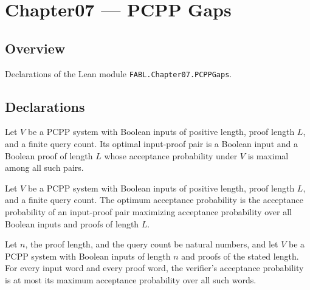 \chapter{Chapter07 — PCPP Gaps}
\section{Overview}

Declarations of the Lean module \texttt{FABL.Chapter07.PCPPGaps}.

\section{Declarations}

\begin{definition}
\label{FABL.PCPPSystem.optimalInputProof}
\leanok
{}
Let $V$ be a PCPP system with Boolean inputs of positive length, proof length $L$, and a
finite query count. Its optimal input-proof pair is a Boolean input and a Boolean proof
of length $L$ whose acceptance probability under $V$ is maximal among all such pairs.
\end{definition}

\begin{definition}
\label{FABL.PCPPSystem.optimumAcceptance}
\leanok
{}
Let $V$ be a PCPP system with Boolean inputs of positive length, proof length $L$, and a
finite query count. The optimum acceptance probability is the acceptance probability of
an input-proof pair maximizing acceptance probability over all Boolean inputs and proofs
of length $L$.
\end{definition}

\begin{theorem}
\label{FABL.PCPPSystem.acceptanceProbability_le_optimumAcceptance}
\leanok
{}
Let $n$, the proof length, and the query count be natural numbers, and let $V$ be a PCPP
system with Boolean inputs of length $n$ and proofs of the stated length. For every
input word and every proof word, the verifier's acceptance probability is at most its
maximum acceptance probability over all such words.
\end{theorem}

